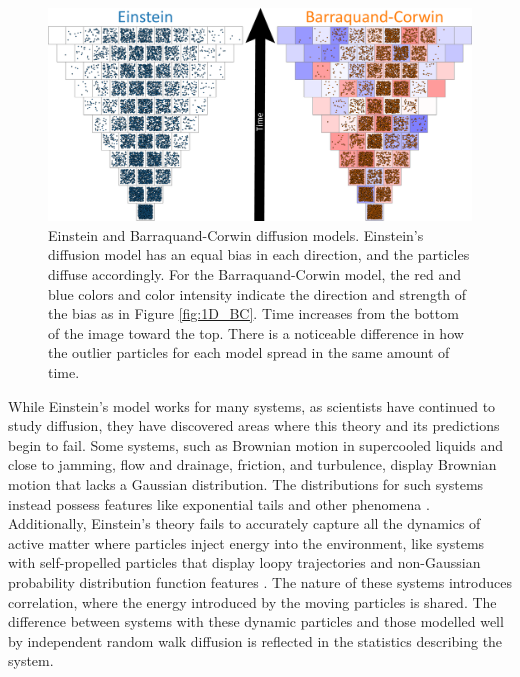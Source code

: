 \begin{figure}[htp]
\includegraphics[width=0.8\columnwidth]{Figures/TriangleGrowth-01.png}
\caption{\label{fig:comparison} Einstein and Barraquand-Corwin diffusion models. Einstein's diffusion model has an equal bias in each direction, and the particles diffuse accordingly. For the Barraquand-Corwin model, the red and blue colors and color intensity indicate the direction and strength of the bias as in Figure \ref{fig:1D_BC}. Time increases from the bottom of the image toward the top. There is a noticeable difference in how the outlier particles for each model spread in the same amount of time.}
\end{figure}

While Einstein's model works for many systems, as scientists have continued to study diffusion, they have discovered areas where this theory and its predictions begin to fail. Some systems, such as Brownian motion in supercooled liquids and close to jamming, flow and drainage, friction, and turbulence, display Brownian motion that lacks a Gaussian distribution\cite{wang_when_2012}. The distributions for such systems instead possess features like exponential tails and other phenomena \cite{metzler_brownian_2019, wang_when_2012}. Additionally, Einstein’s theory fails to accurately capture all the dynamics of active matter where particles inject energy into the environment, like systems with self-propelled particles that display loopy trajectories and non-Gaussian probability distribution function features \cite{kanazawa_loopy_2020, ramaswamy_mechanics_2010}. The nature of these systems introduces correlation, where the energy introduced by the moving particles is shared. The difference between systems with these dynamic particles and those modelled well by independent random walk diffusion is reflected in the statistics describing the system.

